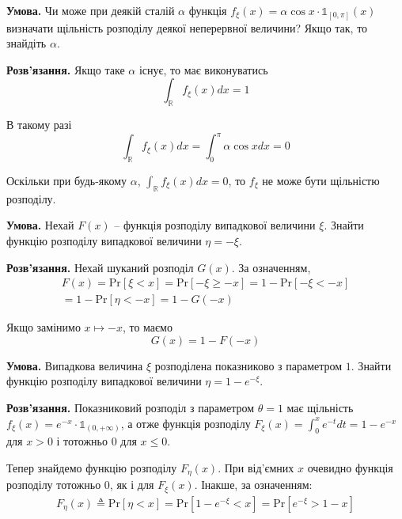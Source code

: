 \documentclass[oneside,solution]{karazin-prob-theory-assign}
\begin{document}
\hspace{20px}\textbf{Умова.} Чи може при деякій сталій $\alpha$ функція $f_{\xi}(x) = \alpha \cos x \cdot \mathds{1}_{[0,\pi]}(x)$ визначати щільність розподілу деякої неперервної величини? Якщо так, то знайдіть $\alpha$.

\textbf{Розв'язання.} Якщо таке $\alpha$ існує, то має виконуватись
\begin{equation}
    \int_{\mathbb{R}}f_{\xi}(x)dx = 1
\end{equation}

В такому разі
\begin{equation}
    \int_{\mathbb{R}} f_{\xi}(x)dx = \int_0^{\pi}\alpha \cos x dx = 0
\end{equation}

Оскільки при будь-якому $\alpha$, $\int_{\mathbb{R}} f_{\xi}(x)dx=0$, то $f_{\xi}$ не може бути щільністю розподілу. 


\hspace{20px}\textbf{Умова.} Нехай $F(x)$ -- функція розподілу випадкової величини $\xi$. Знайти функцію розподілу випадкової величини $\eta=-\xi$.

\textbf{Розв'язання.} Нехай шуканий розподіл $G(x)$. За означенням,
\begin{align}
    F(x) = \text{Pr}[\xi < x] = \text{Pr}[-\xi \geq -x] = 1 - \text{Pr}[-\xi < -x] \nonumber \\
    = 1 - \text{Pr}[\eta < -x] = 1 - G(-x)
\end{align}

Якщо замінимо $x \mapsto -x$, то маємо
\begin{equation}
    \boxed{G(x) = 1 - F(-x)}
\end{equation}


\hspace{20px}\textbf{Умова.} Випадкова величина $\xi$ розподілена показниково з параметром $1$. Знайти функцію розподілу випадкової величини $\eta=1-e^{-\xi}$.

\textbf{Розв'язання.} Показниковий розподіл з параметром $\theta=1$ має щільність $f_{\xi}(x) = e^{-x}\cdot \mathds{1}_{(0,+\infty)}$, а отже функція розподілу $F_{\xi}(x) = \int_0^x e^{-t}dt = 1-e^{-x}$ для $x > 0$ і тотожньо $0$ для $x \leq 0$. 

Тепер знайдемо функцію розподілу $F_{\eta}(x)$. При від'ємних $x$ очевидно функція розподілу тотожньо $0$, як і для $F_{\xi}(x)$. Інакше, за означенням:
\begin{align}
    F_{\eta}(x) \triangleq \text{Pr}[\eta < x] = \text{Pr}[1-e^{-\xi} < x] = \text{Pr}[e^{-\xi} > 1 - x]
\end{align}
\end{document}
